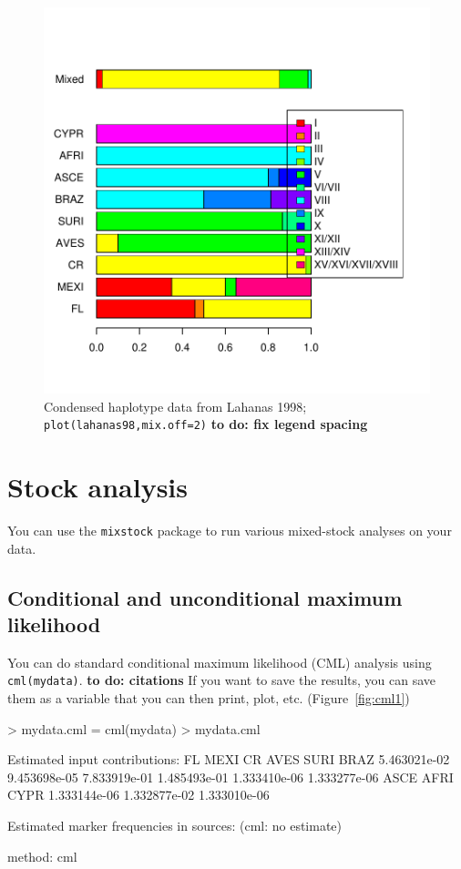 \documentclass[11pt]{article}
\newcommand{\code}[1]{{\tt #1}}
\begin{document}
\begin{figure}
\includegraphics{mixstock-013}
\caption{Condensed haplotype data from Lahanas 1998;
\code{plot(lahanas98,mix.off=2)}
\textbf{to do: fix legend spacing}}
\label{fig:condensed}
\end{figure}

\section{Stock analysis}
You can use the \code{mixstock} package to
run various mixed-stock analyses on your data.

\subsection{Conditional and unconditional maximum likelihood}
You can do standard conditional maximum likelihood
(CML) analysis using \verb+cml(mydata)+.
\textbf{to do: citations}
If you want to save the results, you can save them
as a variable that you can then print, plot, etc.
(Figure~\ref{fig:cml1})
\begin{Schunk}
\begin{Sinput}
> mydata.cml = cml(mydata)
> mydata.cml
\end{Sinput}
\begin{Soutput}
Estimated input contributions:
          FL         MEXI           CR         AVES         SURI         BRAZ 
5.463021e-02 9.453698e-05 7.833919e-01 1.485493e-01 1.333410e-06 1.333277e-06 
        ASCE         AFRI         CYPR 
1.333144e-06 1.332877e-02 1.333010e-06 

Estimated marker frequencies in sources:
(cml: no estimate)

method: cml 
\end{Soutput}
\end{Schunk}
\end{document}
